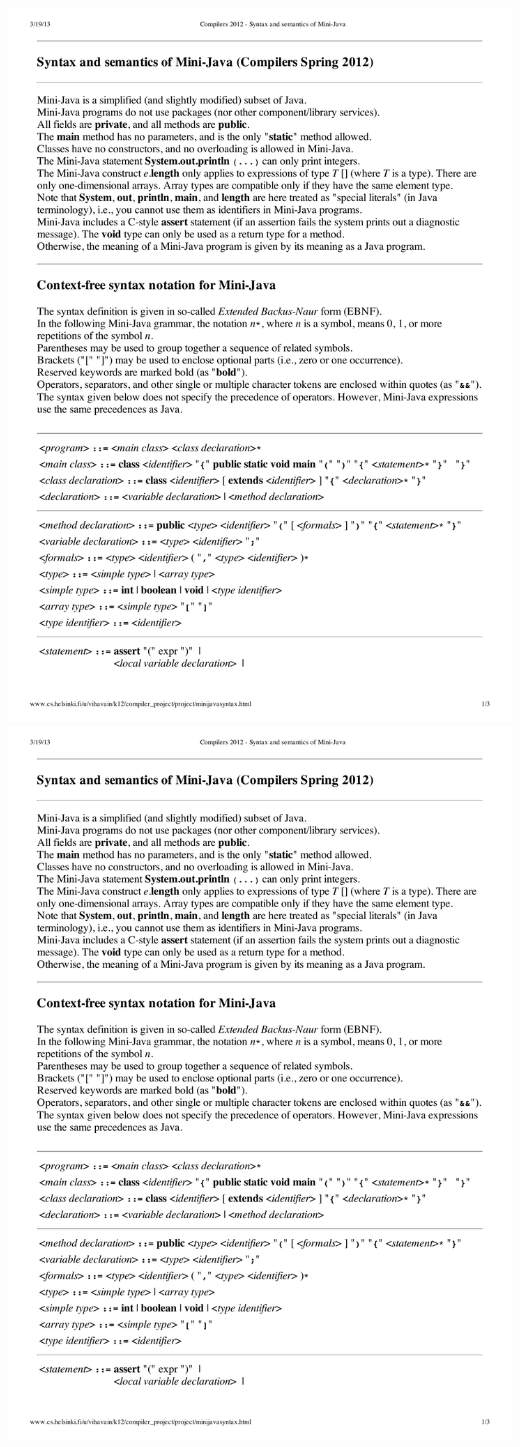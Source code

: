 \documentclass[a4paper,11pt]{article}
\begin{document}
\includegraphics[width=1.0\textwidth,page=2]{spec.pdf}
\includegraphics[width=1.0\textwidth,page=3]{spec.pdf}
\end{document}
